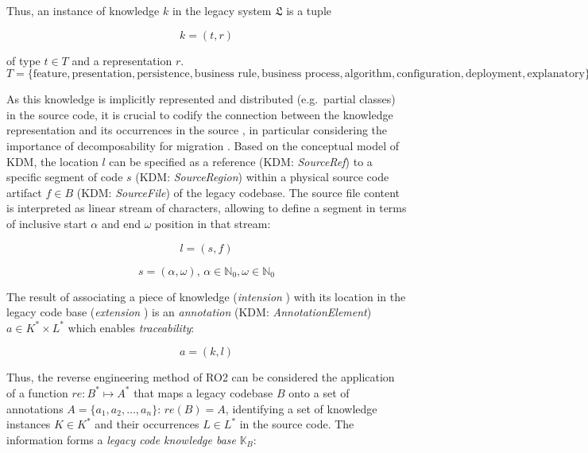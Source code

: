 Thus, an instance of knowledge \(k\) in the legacy system \(\mathfrak{L}\) is a tuple

\begin{equation}k = (t, r)\label{eq:knowledge}\end{equation}

of type \(t \in T\) and a representation \(r\).
\begin{equation}T = \{\textrm{feature}, \textrm{presentation}, \textrm{persistence}, \textrm{business rule}, \textrm{business process}, \textrm{algorithm}, \textrm{configuration}, \textrm{deployment}, \textrm{explanatory}\}\label{eq:knowledge-types}\end{equation}

As this knowledge is implicitly represented and distributed (e.g.~partial classes) in the source code, it is crucial to codify the connection between the knowledge representation and its occurrences in the source \autocite{Rajlich2002Concepts}, in particular considering the importance of decomposability for migration \autocite{Lucia2008,Canfora2000Decomposing}.
Based on the conceptual model of KDM, the location \(l\) can be specified as a reference (KDM: \emph{SourceRef}) to a specific segment of code \(s\) (KDM: \emph{SourceRegion}) within a physical source code artifact \(f \in B\) (KDM: \emph{SourceFile}) of the legacy codebase.
The source file content is interpreted as linear stream of characters, allowing to define a segment in terms of inclusive start \(\alpha\) and end \(\omega\) position in that stream:

\begin{equation}l = (s,f)\label{eq:location}\end{equation}

\begin{equation}s=(\alpha, \omega) \textrm{, } \alpha\in \mathbb{N}_{0}, \omega \in \mathbb{N}_{0}\label{eq:segment}\end{equation}

The result of associating a piece of knowledge (\emph{intension} \autocite{Chen2010FeatureLocation}) with its location in the legacy code base (\emph{extension} \autocite{Chen2010FeatureLocation}) is an \emph{annotation} (KDM: \emph{AnnotationElement}) \(a \in K^* \times L^*\) which enables \emph{traceability}:

\begin{equation}a = (k, l)\label{eq:annotation}\end{equation}

Thus, the reverse engineering method of RO2 can be considered the application of a function \(re: B^* \mapsto A^*\) that maps a legacy codebase \(B\) onto a set of annotations \(A = \{a_1,a_2,\ldots,a_n\}\): \(re(B) = A\), identifying a set of knowledge instances \(K\in K^*\) and their occurrences \(L \in L^*\) in the source code.
The information forms a \emph{legacy code knowledge base} \(\mathbb{K}_{B}\):

